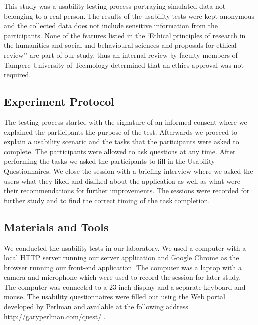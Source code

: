 \documentclass[twocolumn]{bmcart}%
\begin{document}
This study was a usability testing process portraying simulated data not belonging to a real person. The results of the usability tests were kept anonymous and the collected data does not include sensitive information from the participants. None of the features listed in the `Ethical principles of research in the humanities and social and behavioural sciences and proposals for ethical review'' are part of our study, thus an internal review by faculty members of Tampere University of Technology determined that an ethics approval was not required.

\subsection*{Experiment Protocol}


The testing process started with the signature of an informed consent where we explained the participants the purpose of the test. Afterwards we proceed to explain a usability scenario and the tasks that the participants were asked to complete. The participants were allowed to ask questions at any time. After performing the tasks we asked the participants to fill in the Usability Questionnaires. We close the session with a briefing interview where we asked the users what they liked and disliked about the application as well as what were their recommendations for further improvements. The sessions were recorded for further study and to find the correct timing of the task completion.

\subsection*{Materials and Tools} 

We conducted the usability tests in our laboratory. We used a computer with a local HTTP server running our server application and Google Chrome as the browser running our front-end application. The computer was a laptop with a camera and microphone which were used to record the session for later study. The computer was connected to a 23 inch display and a separate keyboard and mouse. The usability questionnaires were filled out using the Web portal developed by Perlman and available at the following address \url{http://garyperlman.com/quest/} .
\end{document}
